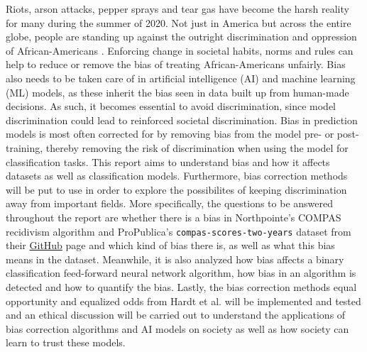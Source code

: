 \documentclass[11pt, fleqn, titlepage]{article}
\begin{document}
	Riots, arson attacks, pepper sprays and tear gas have become the harsh reality for many during the summer of 2020. Not just in America but across the entire globe, people are standing up against the outright discrimination and oppression of African-Americans \cite{tv2, cnn1, cnn2, euro, guardian}. Enforcing change in societal habits, norms and rules can help to reduce or remove the bias of treating African-Americans unfairly. Bias also needs to be taken care of in artificial intelligence (AI) and machine learning (ML) models, as these inherit the bias seen in data built up from human-made decisions. As such, it becomes essential to avoid discrimination, since model discrimination could lead to reinforced societal discrimination. Bias in prediction models is most often corrected for by removing bias from the model pre- or post-training, thereby removing the risk of discrimination when using the model for classification tasks. This report aims to understand bias and how it affects datasets as well as classification models. Furthermore, bias correction methods will be put to use in order to explore the possibilites of keeping discrimination away from important fields. More specifically, the questions to be answered throughout the report are whether there is a bias in Northpointe's COMPAS recidivism algorithm and ProPublica's \texttt{compas-scores-two-years} dataset from their \href{https://github.com/propublica/compas-analysis/blob/master/compas-scores-two-years.csv}{GitHub} page and which kind of bias there is, as well as what this bias means in the dataset. Meanwhile, it is also analyzed how bias affects a binary classification feed-forward neural network algorithm, how bias in an algorithm is detected and how to quantify the bias. Lastly, the bias correction methods equal opportunity and equalized odds from Hardt et al. \cite{equal_of_oppor} will be implemented and tested and an ethical discussion will be carried out to understand the applications of bias correction algorithms and AI models on society as well as how society can learn to trust these models. \\
	
\end{document}
